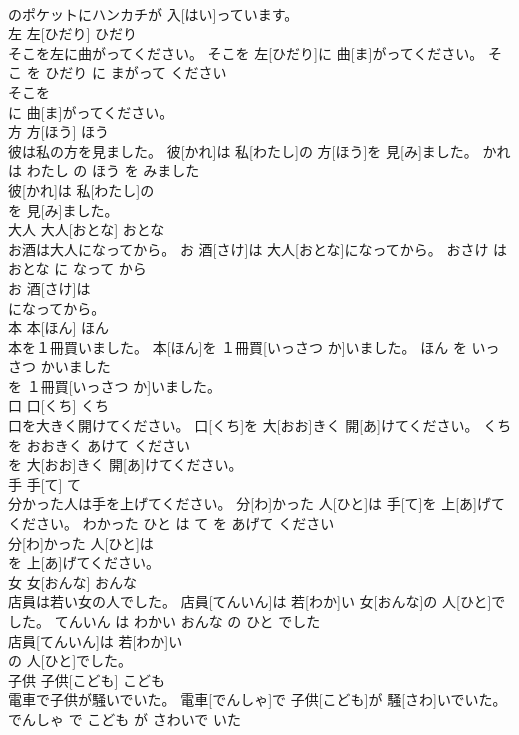 \documentclass[8pt]{extreport}
\begin{document}
\begin{CJK}{UTF8}{min}
\\	のポケットにハンカチが 入[はい]っています。			
\\	左	左[ひだり]	ひだり	
\\	そこを左に曲がってください。	そこを 左[ひだり]に 曲[ま]がってください。	そこ を ひだり に まがって ください	
\\	そこを
\\	に 曲[ま]がってください。			
\\	方	方[ほう]	ほう	
\\	彼は私の方を見ました。	彼[かれ]は 私[わたし]の 方[ほう]を 見[み]ました。	かれ は わたし の ほう を みました	
\\	彼[かれ]は 私[わたし]の
\\	を 見[み]ました。			
\\	大人	大人[おとな]	おとな	
\\	お酒は大人になってから。	お 酒[さけ]は 大人[おとな]になってから。	おさけ は おとな に なって から	
\\	お 酒[さけ]は
\\	になってから。			
\\	本	本[ほん]	ほん	
\\	本を１冊買いました。	本[ほん]を １冊買[いっさつ か]いました。	ほん を いっさつ かいました	
\\	を １冊買[いっさつ か]いました。			
\\	口	口[くち]	くち	
\\	口を大きく開けてください。	口[くち]を 大[おお]きく 開[あ]けてください。	くち を おおきく あけて ください	
\\	を 大[おお]きく 開[あ]けてください。			
\\	手	手[て]	て	
\\	分かった人は手を上げてください。	分[わ]かった 人[ひと]は 手[て]を 上[あ]げてください。	わかった ひと は て を あげて ください	
\\	分[わ]かった 人[ひと]は
\\	を 上[あ]げてください。			
\\	女	女[おんな]	おんな	
\\	店員は若い女の人でした。	店員[てんいん]は 若[わか]い 女[おんな]の 人[ひと]でした。	てんいん は わかい おんな の ひと でした	
\\	店員[てんいん]は 若[わか]い
\\	の 人[ひと]でした。			
\\	子供	子供[こども]	こども	
\\	電車で子供が騒いでいた。	電車[でんしゃ]で 子供[こども]が 騒[さわ]いでいた。	でんしゃ で こども が さわいで いた	

\end{CJK}
\end{document}
